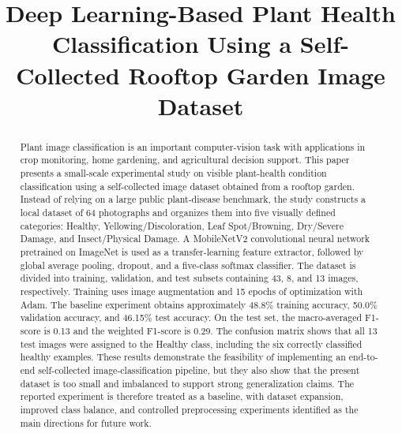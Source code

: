 \documentclass[conference]{IEEEtran}
\begin{document}
\title{Deep Learning-Based Plant Health Classification Using a Self-Collected Rooftop Garden Image Dataset}

\author{
}

\maketitle

\begin{abstract}
Plant image classification is an important computer-vision task with applications in crop monitoring, home gardening, and agricultural decision support. This paper presents a small-scale experimental study on visible plant-health condition classification using a self-collected image dataset obtained from a rooftop garden. Instead of relying on a large public plant-disease benchmark, the study constructs a local dataset of 64 photographs and organizes them into five visually defined categories: Healthy, Yellowing/Discoloration, Leaf Spot/Browning, Dry/Severe Damage, and Insect/Physical Damage. A MobileNetV2 convolutional neural network pretrained on ImageNet is used as a transfer-learning feature extractor, followed by global average pooling, dropout, and a five-class softmax classifier. The dataset is divided into training, validation, and test subsets containing 43, 8, and 13 images, respectively. Training uses image augmentation and 15 epochs of optimization with Adam. The baseline experiment obtains approximately 48.8\% training accuracy, 50.0\% validation accuracy, and 46.15\% test accuracy. On the test set, the macro-averaged F1-score is 0.13 and the weighted F1-score is 0.29. The confusion matrix shows that all 13 test images were assigned to the Healthy class, including the six correctly classified healthy examples. These results demonstrate the feasibility of implementing an end-to-end self-collected image-classification pipeline, but they also show that the present dataset is too small and imbalanced to support strong generalization claims. The reported experiment is therefore treated as a baseline, with dataset expansion, improved class balance, and controlled preprocessing experiments identified as the main directions for future work.
\end{abstract}
\end{document}
